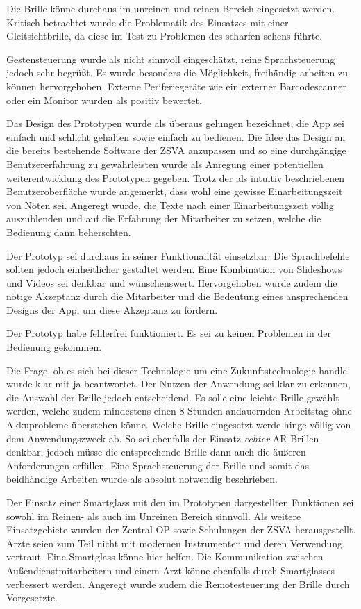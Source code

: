 Die Brille könne durchaus im unreinen und reinen Bereich eingesetzt werden. Kritisch betrachtet wurde die Problematik des Einsatzes mit einer Gleitsichtbrille, da diese im Test zu Problemen des scharfen sehens führte.

Gestensteuerung wurde als nicht sinnvoll eingeschätzt, reine Sprachsteuerung jedoch sehr begrüßt. Es wurde besonders die Möglichkeit, freihändig arbeiten zu können hervorgehoben. Externe Periferiegeräte wie ein externer Barcodescanner oder ein Monitor wurden als positiv bewertet.

Das Design des Prototypen wurde als überaus gelungen bezeichnet, die App sei einfach und schlicht gehalten sowie einfach zu bedienen. Die Idee das Design an die bereits bestehende Software der ZSVA anzupassen und so eine durchgängige Benutzererfahrung zu gewährleisten wurde als Anregung einer potentiellen weiterentwicklung des Prototypen gegeben. Trotz der als intuitiv beschriebenen Benutzeroberfläche wurde angemerkt, dass wohl eine gewisse Einarbeitungszeit von Nöten sei. Angeregt wurde, die Texte nach einer Einarbeitungszeit völlig auszublenden und auf die Erfahrung der Mitarbeiter zu setzen, welche die Bedienung dann beherschten. 

Der Prototyp sei durchaus in seiner Funktionalität einsetzbar. Die Sprachbefehle sollten jedoch einheitlicher gestaltet werden. Eine Kombination von Slideshows und Videos sei denkbar und wünschenswert. Hervorgehoben wurde zudem die nötige Akzeptanz durch die Mitarbeiter und die Bedeutung eines ansprechenden Designs der App, um diese Akzeptanz zu fördern.

Der Prototyp habe fehlerfrei funktioniert. Es sei zu keinen Problemen in der Bedienung gekommen.

Die Frage, ob es sich bei dieser Technologie um eine Zukunftstechnologie handle wurde klar mit ja beantwortet. Der Nutzen der Anwendung sei klar zu erkennen, die Auswahl der Brille jedoch entscheidend. Es solle eine leichte Brille gewählt werden, welche zudem mindestens einen 8 Stunden andauernden Arbeitstag ohne Akkuprobleme überstehen könne. Welche Brille eingesetzt werde hinge völlig von dem Anwendungszweck ab. So sei ebenfalls der Einsatz \emph{echter} AR-Brillen denkbar, jedoch müsse die entsprechende Brille dann auch die äußeren Anforderungen erfüllen. Eine Sprachsteuerung der Brille und somit das beidhändige Arbeiten wurde als absolut notwendig beschrieben. 

Der Einsatz einer Smartglass mit den im Prototypen dargestellten Funktionen sei sowohl im Reinen- als auch im Unreinen Bereich sinnvoll. Als weitere Einsatzgebiete wurden der Zentral-OP sowie Schulungen der ZSVA herausgestellt. Ärzte seien zum Teil nicht mit modernen Instrumenten und deren Verwendung vertraut. Eine Smartglass könne hier helfen. Die Kommunikation zwischen Außendienstmitarbeitern und einem Arzt könne ebenfalls durch Smartglasses verbessert werden. Angeregt wurde zudem die Remotesteuerung der Brille durch Vorgesetzte.

